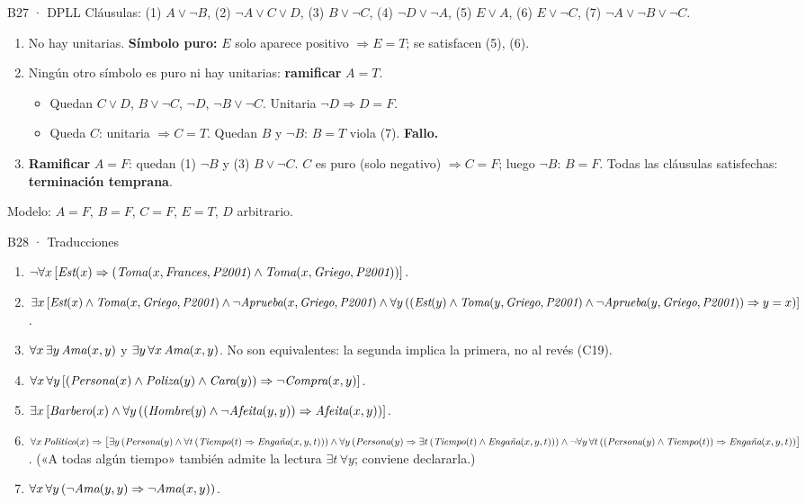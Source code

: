 \begin{solucion}{B27 · DPLL}
Cláusulas: (1) $A\vee\neg B$, (2) $\neg A\vee C\vee D$, (3) $B\vee\neg C$, (4) $\neg D\vee\neg A$, (5) $E\vee A$,
(6) $E\vee\neg C$, (7) $\neg A\vee\neg B\vee\neg C$.
\begin{enumerate}[nosep]
\item No hay unitarias. \textbf{Símbolo puro:} $E$ solo aparece positivo $\Rightarrow E=T$; se satisfacen (5), (6).
\item Ningún otro símbolo es puro ni hay unitarias: \textbf{ramificar} $A=T$.
\begin{itemize}[nosep]
\item Quedan $C\vee D$, $B\vee\neg C$, $\neg D$, $\neg B\vee\neg C$. Unitaria $\neg D\Rightarrow D=F$.
\item Queda $C$: unitaria $\Rightarrow C=T$. Quedan $B$ y $\neg B$: $B=T$ viola (7). \textbf{Fallo.}
\end{itemize}
\item \textbf{Ramificar} $A=F$: quedan (1) $\neg B$ y (3) $B\vee\neg C$. $C$ es puro (solo negativo) $\Rightarrow C=F$;
luego $\neg B$: $B=F$. Todas las cláusulas satisfechas: \textbf{terminación temprana}.
\end{enumerate}
Modelo: $A=F$, $B=F$, $C=F$, $E=T$, $D$ arbitrario.
\end{solucion}

\begin{solucion}{B28 · Traducciones}
\begin{enumerate}[label=(\alph*),nosep]
\item $\neg\forall x\,[\textit{Est}(x)\Rightarrow(\textit{Toma}(x,\textit{Frances},\textit{P2001})\wedge\textit{Toma}(x,\textit{Griego},\textit{P2001}))]$.
\item $\exists x\,[\textit{Est}(x)\wedge\textit{Toma}(x,\textit{Griego},\textit{P2001})\wedge\neg\textit{Aprueba}(x,\textit{Griego},\textit{P2001})
\wedge\forall y\,((\textit{Est}(y)\wedge\textit{Toma}(y,\textit{Griego},\textit{P2001})\wedge\neg\textit{Aprueba}(y,\textit{Griego},\textit{P2001}))\Rightarrow y=x)]$.
\item $\forall x\,\exists y\,\textit{Ama}(x,y)$ \;y\; $\exists y\,\forall x\,\textit{Ama}(x,y)$. No son equivalentes: la segunda implica la primera, no al revés (C19).
\item $\forall x\,\forall y\,[(\textit{Persona}(x)\wedge\textit{Poliza}(y)\wedge\textit{Cara}(y))\Rightarrow\neg\textit{Compra}(x,y)]$.
\item $\exists x\,[\textit{Barbero}(x)\wedge\forall y\,((\textit{Hombre}(y)\wedge\neg\textit{Afeita}(y,y))\Rightarrow\textit{Afeita}(x,y))]$.
\item $\forall x\,\textit{Politico}(x)\Rightarrow\big[\exists y\,(\textit{Persona}(y)\wedge\forall t\,(\textit{Tiempo}(t)\Rightarrow\textit{Engaña}(x,y,t)))\wedge
\forall y\,(\textit{Persona}(y)\Rightarrow\exists t\,(\textit{Tiempo}(t)\wedge\textit{Engaña}(x,y,t)))\wedge
\neg\forall y\,\forall t\,((\textit{Persona}(y)\wedge\textit{Tiempo}(t))\Rightarrow\textit{Engaña}(x,y,t))\big]$.
(«A todas algún tiempo» también admite la lectura $\exists t\,\forall y$; conviene declararla.)
\item $\forall x\,\forall y\,(\neg\textit{Ama}(y,y)\Rightarrow\neg\textit{Ama}(x,y))$.
\end{enumerate}
\end{solucion}

